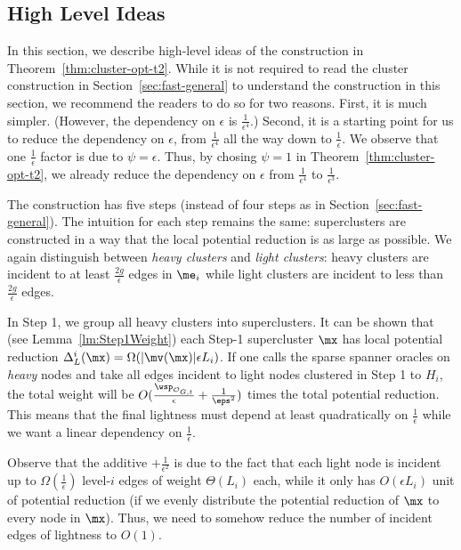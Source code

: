 \subsection{High Level Ideas}\label{subsec:highLevel-t2}

In this section, we describe high-level ideas of the construction in Theorem~\ref{thm:cluster-opt-t2}. While it is not required to read the cluster construction in Section~\ref{sec:fast-general} to understand the construction in this section, we recommend the readers to do so for two reasons. First, it is much simpler. (However, the dependency on $\epsilon$ is $\frac{1}{\epsilon^4}$.) Second, it is a starting point for us to reduce the dependency on $\epsilon$, from $\frac{1}{\epsilon^4}$ all the way down to $\frac{1}{\epsilon}$. We observe that one $\frac{1}{\epsilon}$ factor is due to $\psi = \epsilon$.  Thus, by chosing $\psi = 1$ in Theorem~\ref{thm:cluster-opt-t2}, we already reduce the dependency on $\epsilon$ from $\frac{1}{\epsilon^4}$ to $\frac{1}{\epsilon^3}$.

The construction has five steps (instead of four steps as in Section~\ref{sec:fast-general}). The intuition for each step remains the same: superclusters are constructed in a way that the local potential reduction is as large as possible. We again distinguish between \emph{heavy clusters} and \emph{light clusters}: heavy clusters are incident to at least $\frac{2g}{\epsilon}$ edges in $\me_i$ while light clusters are incident to less than $\frac{2g}{\epsilon}$ edges.  

In Step 1, we group all heavy clusters into superclusters. It can be shown that (see Lemma~\ref{lm:Step1Weight}) each Step-1 supercluster $\mx$ has local potential reduction $\Delta^i_{L}(\mx) = \Omega(|\mv(\mx)|\epsilon L_i)$. If one calls the sparse spanner oracles  on \emph{heavy} nodes and  take all edges incident to light nodes clustered in Step 1 to $H_i$, the total weight will be $O(\frac{\wsp_{\mathcal{O}_{G,t}}}{\epsilon} + \frac{1}{\eps^2})$  times the total potential reduction. This means that the final lightness must depend at least quadratically on $\frac{1}{\epsilon}$ while we want a linear dependency on $\frac{1}{\epsilon}$. 

Observe that the additive $+\frac{1}{\epsilon^2}$ is due to the fact that each light node is incident up to $\Omega(\frac{1}{\epsilon})$ level-$i$ edges of weight  $\Theta(L_i)$ each, while it only has $O(\epsilon L_i)$ unit of  potential reduction (if we evenly distribute the potential reduction of $\mx$ to every node in $\mx$). Thus, we need to somehow reduce the number of incident edges of lightness to $O(1)$. 

